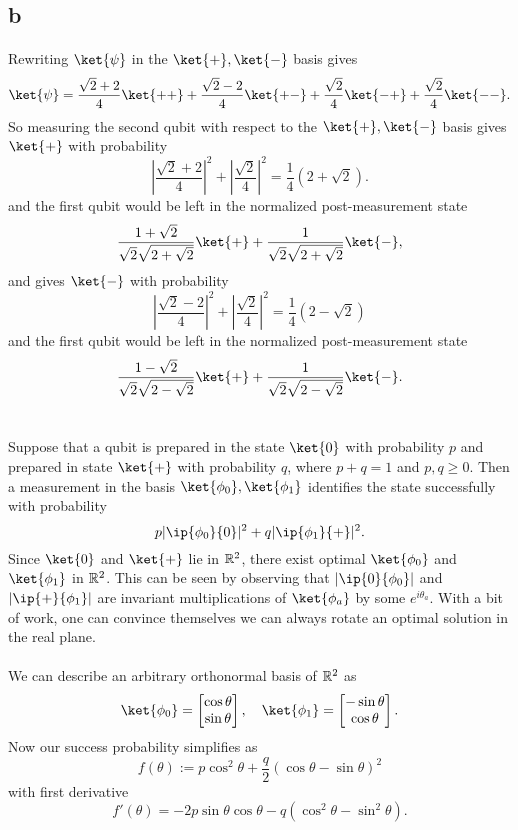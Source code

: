 \documentclass[letterpaper,12pt,oneside,onecolumn]{article}
\DeclarePairedDelimiter\abs{\lvert}{\rvert}%
\begin{document}
\subsection{b}
\paragraph{}
Rewriting $\ket{\psi}$ in the $\ket{+}, \ket{-}$ basis gives
$$\ket{\psi} = \frac{\sqrt{2} + 2}{4}\ket{++} + \frac{\sqrt{2}-2}{4}\ket{+-} + \frac{\sqrt{2}}{4}\ket{-+} + \frac{\sqrt{2}}{4}\ket{--}.$$
So measuring the second qubit with respect to the $\ket{+}, \ket{-}$ basis gives $\ket{+}$ with probability
$$|\frac{\sqrt{2}+2}{4}|^2+ |\frac{\sqrt{2}}{4}|^2 = \frac{1}{4}(2 + \sqrt{2}).$$
and the first qubit would be left in the normalized post-measurement state
$$ \frac{1 + \sqrt{2}}{\sqrt{2}\sqrt{2+\sqrt{2}}}\ket{+} + \frac{1}{\sqrt{2}\sqrt{2+\sqrt{2}}}\ket{-},$$
and gives $\ket{-}$ with probability
$$|\frac{\sqrt{2}-2}{4}|^2+ |\frac{\sqrt{2}}{4}|^2 = \frac{1}{4}(2 - \sqrt{2})$$
and the first qubit would be left in the normalized post-measurement state
$$\frac{1-\sqrt{2}}{\sqrt{2}\sqrt{2-\sqrt{2}}}\ket{+} + \frac{1}{\sqrt{2}\sqrt{2-\sqrt{2}}}\ket{-} .$$
\newpage
\section{}
\paragraph{}
Suppose that a qubit is prepared in the state $\ket{0}$ with probability $p$ and prepared in state $\ket{+}$ with probability $q$, where $p+q=1$ and $p,q\geq 0$. Then a measurement in the basis $\ket{\phi_0}, \ket{\phi_1}$ identifies the state successfully with probability
$$p\abs{\ip{\phi_0}{0}}^2 + q\abs{\ip{\phi_1}{+}}^2.$$
Since $\ket{0}$ and $\ket{+}$ lie in $\mathbb{R}^2$, there exist optimal $\ket{\phi_0}$ and $\ket{\phi_1}$ in $\mathbb{R}^2$. This can be seen by observing that $\abs{\ip{0}{\phi_0}}$ and $\abs{\ip{+}{\phi_1}}$ are invariant multiplications of $\ket{\phi_a}$ by some $e^{i\theta_a}$. With a bit of work, one can convince themselves we can always rotate an optimal solution in the real plane.
\paragraph{}
We can describe an arbitrary orthonormal basis of $\mathbb{R}^2$ as
$$\ket{\phi_0} = \begin{bmatrix} \cos\theta \\ \sin\theta \end{bmatrix}, \quad \ket{\phi_1}=\begin{bmatrix}-\sin\theta \\ \cos\theta \end{bmatrix}.$$
Now our success probability simplifies as
$$f(\theta) :=p\cos^2\theta + \frac{q}{2}(\cos\theta - \sin\theta)^2$$
with first derivative
$$f'(\theta) = -2p\sin\theta\cos\theta - q(\cos^2\theta - \sin^2\theta).$$
\end{document}
